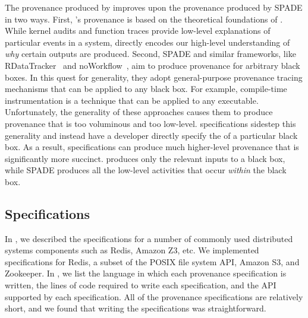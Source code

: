 The provenance produced by \fluent{} improves upon the provenance produced by
SPADE in two ways. First, \fluent{}'s provenance is based on the theoretical
foundations of \watprovenance{}. While kernel audits and function traces
provide low-level explanations of particular events in a system,
\watprovenance{} directly encodes our high-level understanding of \emph{why}
certain outputs are produced. Second, SPADE and similar frameworks, like
RDataTracker~\cite{lerner2014collecting} and
noWorkflow~\cite{murta2014noworkflow}, aim to produce provenance for arbitrary
black boxes. In this quest for generality, they adopt general-purpose
provenance tracing mechanisms that can be applied to any black box. For
example, compile-time instrumentation is a technique that can be applied to any
executable.  Unfortunately, the generality of these approaches causes them to
produce provenance that is too voluminous and too low-level. \Watprovenance{}
specifications sidestep this generality and instead have a developer directly
specify the \watprovenance{} of a particular black box. As a result,
\watprovenance{} specifications can produce much higher-level provenance that
is significantly more succinct. \Watprovenance{} produces only the relevant
inputs to a black box, while SPADE produces all the low-level activities that
occur \emph{within} the black box.


\subsection{\WatProvenance{} Specifications}
In , we described the \watprovenance{} specifications for
a number of commonly used distributed systems components such as Redis, Amazon
Z3, etc. We implemented \fluent{} \watprovenance{} specifications for Redis, a
subset of the POSIX file system API, Amazon S3, and Zookeeper. In
, we list the language in which each provenance
specification is written, the lines of code required to write each
specification, and the API supported by each specification. All of the
provenance specifications are relatively short, and we found that writing the
specifications was straightforward.


